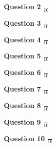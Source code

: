 {\bf Question 2} \hspace*{.2in} \Large{$\frac{}{10}$}

\newpage

{\bf Question 3} \hspace*{.2in} \Large{$\frac{}{10}$}

\newpage

{\bf Question 4} \hspace*{.2in} \Large{$\frac{}{10}$}

\newpage

{\bf Question 5} \hspace*{.2in} \Large{$\frac{}{10}$}

\newpage

{\bf Question 6} \hspace*{.2in} \Large{$\frac{}{10}$}

\newpage

{\bf Question 7} \hspace*{.2in} \Large{$\frac{}{10}$}

\newpage

{\bf Question 8} \hspace*{.2in} \Large{$\frac{}{10}$}

\newpage

{\bf Question 9} \hspace*{.2in} \Large{$\frac{}{10}$}

\newpage

{\bf Question 10} \hspace*{.2in} \Large{$\frac{}{10}$}

\newpage



